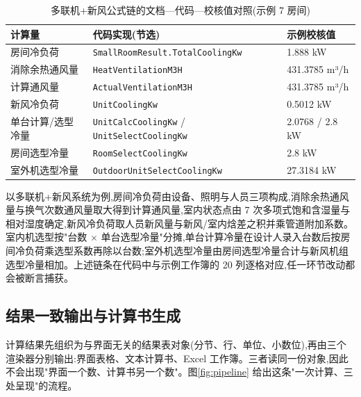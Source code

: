 \documentclass[UTF8,a4paper,zihao=-4]{ctexart}
\begin{document}
\begin{table}[H]
\centering
\caption{多联机+新风公式链的文档—代码—校核值对照(示例 7 房间)}\label{tab:formula}
\footnotesize
\begin{tabular}{p{3.1cm}p{5.6cm}p{4.1cm}}
\toprule
计算量 & 代码实现(节选) & 示例校核值 \\
\midrule
房间冷负荷 & \texttt{SmallRoomResult.TotalCoolingKw} & 1.888 kW \\
消除余热通风量 & \texttt{HeatVentilationM3H} & 431.3785 m³/h \\
计算通风量 & \texttt{ActualVentilationM3H} & 431.3785 m³/h \\
新风冷负荷 & \texttt{UnitCoolingKw} & 0.5012 kW \\
单台计算/选型冷量 & \texttt{UnitCalcCoolingKw} / \texttt{UnitSelectCoolingKw} & 2.0768 / 2.8 kW \\
房间选型冷量 & \texttt{RoomSelectCoolingKw} & 2.8 kW \\
室外机选型冷量 & \texttt{OutdoorUnitSelectCoolingKw} & 27.3184 kW \\
\bottomrule
\end{tabular}
\end{table}

以多联机+新风系统为例,房间冷负荷由设备、照明与人员三项构成,消除余热通风量与换气次数通风量取大得到计算通风量,室内状态点由 7 次多项式饱和含湿量与相对湿度确定,新风冷负荷取人员新风量与新风/室内焓差之积并乘管道附加系数。室内机选型按"台数 $\times$ 单台选型冷量"分摊,单台计算冷量在设计人录入台数后按房间冷负荷乘选型系数再除以台数;室外机选型冷量由房间选型冷量合计与新风机组选型冷量相加。上述链条在代码中与示例工作簿的 20 列逐格对应,任一环节改动都会被断言捕获。

\subsection{结果一致输出与计算书生成}

计算结果先组织为与界面无关的结果表对象(分节、行、单位、小数位),再由三个渲染器分别输出:界面表格、文本计算书、Excel 工作簿。三者读同一份对象,因此不会出现"界面一个数、计算书另一个数"。图\ref{fig:pipeline} 给出这条"一次计算、三处呈现"的流程。
\end{document}
